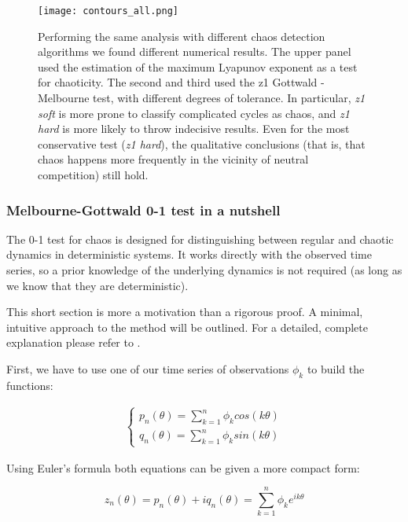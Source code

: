 \begin{figure}[H]
	\begin{center}
		\texttt{[image: contours\_all.png]}
	\end{center}
	\caption{Performing the same analysis with different chaos detection algorithms we found different numerical results. The upper panel used the estimation of the maximum Lyapunov exponent as a test for chaoticity. The second and third used the z1 Gottwald - Melbourne test, with different degrees of tolerance. In particular, \textit{z1 soft} is more prone to classify complicated cycles as chaos, and \textit{z1 hard} is more likely to throw indecisive results. Even for the most conservative test (\textit{z1 hard}), the qualitative conclusions (that is, that chaos happens more frequently in the vicinity of neutral competition) still hold.}
	\label{fig:AllContours}
\end{figure}

\subsubsection{Melbourne-Gottwald 0-1 test in a nutshell}
\label{subsubsec:z1test}
The 0-1 test for chaos is designed for distinguishing between regular and chaotic dynamics in deterministic systems. It works directly with the observed time series, so a prior knowledge of the underlying dynamics is not required (as long as we know that they are deterministic).

This short section is more a motivation than a rigorous proof. A minimal, intuitive approach to the method will be outlined. For a detailed, complete explanation please refer to \cite{Gottwald2009}.

First, we have to use one of our time series of observations $\phi_k$ to build the functions:

\begin{eqnarray}
\label{eq:z1}
	\begin{cases}
	p_n(\theta) = \sum_{k=1}^n \phi_k cos(k \theta)
	\\
	q_n(\theta) = \sum_{k=1}^n \phi_k sin(k \theta)
	\end{cases}
\end{eqnarray}

Using Euler's formula both equations can be given a more compact form:

\begin{equation}
\label{eq:z1complex}
z_n(\theta) = p_n(\theta) + i q_n(\theta) = \sum_{k=1}^n \phi_k e^{i k \theta}
\end{equation}

